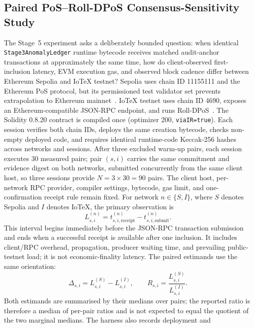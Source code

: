 \documentclass[journal]{IEEEtran}
\begin{document}
\subsection{Paired PoS--Roll-DPoS Consensus-Sensitivity Study}
The Stage~5 experiment asks a deliberately bounded question: when identical
\texttt{Stage3AnomalyLedger} runtime bytecode receives matched audit-anchor
transactions at approximately the same time, how do client-observed
first-inclusion latency, EVM execution gas, and observed block cadence differ
between Ethereum Sepolia and IoTeX testnet? Sepolia uses chain ID 11155111
and the Ethereum PoS protocol, but its permissioned test validator set
prevents extrapolation to Ethereum mainnet~\cite{ethereumNetworks}. IoTeX
testnet uses chain ID 4690, exposes an Ethereum-compatible JSON-RPC endpoint,
and runs Roll-DPoS~\cite{iotexRollDpos,iotexRpc}.
The Solidity 0.8.20 contract is compiled once (optimizer 200,
\texttt{viaIR=true}). Each session verifies both chain IDs, deploys the same
creation bytecode, checks non-empty deployed code, and requires identical
runtime-code Keccak-256 hashes across networks and sessions. After three
excluded warm-up pairs, each session executes 30 measured pairs; pair $(s,i)$
carries the same commitment and evidence digest on both networks, submitted
concurrently from the same client host, so three sessions provide
$N = 3\times 30 = 90$ pairs. The client host, per-network RPC provider,
compiler settings, bytecode, gas limit, and one-confirmation receipt rule
remain fixed.
For network $n \in \{S, I\}$, where $S$ denotes Sepolia and $I$ denotes IoTeX,
the primary observation is
\begin{equation}
L^{(n)}_{s,i} = t^{(n)}_{s,i,\mathrm{receipt}} - t^{(n)}_{s,i,\mathrm{submit}}.
\label{eq:latency}
\end{equation}
This interval begins immediately before the JSON-RPC transaction submission
and ends when a successful receipt is available after one inclusion. It
includes client/RPC overhead, propagation, producer waiting time, and
prevailing public-testnet load; it is not economic-finality latency. The
paired estimands use the same orientation:
\begin{equation}
\Delta_{s,i} = L^{(S)}_{s,i} - L^{(I)}_{s,i}, \qquad
R_{s,i} = \frac{L^{(S)}_{s,i}}{L^{(I)}_{s,i}}.
\label{eq:estimands}
\end{equation}
Both estimands are summarised by their medians over pairs; the reported ratio
is therefore a median of per-pair ratios and is not expected to equal the
quotient of the two marginal medians. The harness also records deployment and
\end{document}
